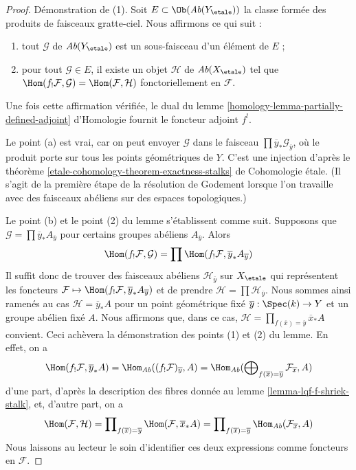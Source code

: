 \begin{proof}
Démonstration de (1). Soit $E \subset \Ob(\textit{Ab}(Y_\etale))$ la classe
formée des produits de faisceaux gratte-ciel. Nous affirmons ce qui suit :
\begin{enumerate}
\item[(a)] tout $\mathcal{G}$ de $\textit{Ab}(Y_\etale)$ est un sous-faisceau
d'un élément de $E$ ;
\item[(b)] pour tout $\mathcal{G} \in E$, il existe un objet
$\mathcal{H}$ de $\textit{Ab}(X_\etale)$ tel que
$\Hom(f_!\mathcal{F}, \mathcal{G}) = \Hom(\mathcal{F}, \mathcal{H})$
fonctoriellement en $\mathcal{F}$.
\end{enumerate}
Une fois cette affirmation vérifiée, le dual du
lemme \ref{homology-lemma-partially-defined-adjoint} d'Homologie
fournit le foncteur adjoint $f^!$.

\medskip\noindent
Le point (a) est vrai, car on peut envoyer $\mathcal{G}$ dans le faisceau
$\prod \overline{y}_*\mathcal{G}_{\overline{y}}$, où le
produit porte sur tous les points géométriques de $Y$. C'est une injection d'après le
théorème \ref{etale-cohomology-theorem-exactness-stalks} de Cohomologie étale.
(Il s'agit de la première étape de la résolution de Godement lorsque
l'on travaille avec des faisceaux abéliens sur des espaces topologiques.)

\medskip\noindent
Le point (b) et le point (2) du lemme s'établissent comme suit.
Supposons que $\mathcal{G} = \prod \overline{y}_*A_{\overline{y}}$
pour certains groupes abéliens $A_{\overline{y}}$. Alors
$$
\Hom(f_!\mathcal{F}, \mathcal{G}) =
\prod \Hom(f_!\mathcal{F}, \overline{y}_*A_{\overline{y}})
$$
Il suffit donc de trouver des faisceaux abéliens $\mathcal{H}_{\overline{y}}$
sur $X_\etale$ qui représentent les foncteurs
$\mathcal{F} \mapsto \Hom(f_!\mathcal{F}, \overline{y}_*A_{\overline{y}})$
et de prendre $\mathcal{H} = \prod \mathcal{H}_{\overline{y}}$.
Nous sommes ainsi ramenés au cas $\mathcal{H} = \overline{y}_*A$
pour un point géométrique fixé $\overline{y} : \Spec(k) \to Y$
et un groupe abélien fixé $A$. Nous affirmons que, dans ce cas,
$\mathcal{H} = \prod_{f(\overline{x}) = \overline{y}} \overline{x}_*A$ convient.
Ceci achèvera la démonstration des points (1) et (2) du lemme.
En effet, on a
$$
\Hom(f_!\mathcal{F}, \overline{y}_*A) =
\Hom_{\textit{Ab}}((f_!\mathcal{F})_{\overline{y}}, A) =
\Hom_{\textit{Ab}}(\bigoplus\nolimits_{f(\overline{x}) = \overline{y}}
\mathcal{F}_{\overline{x}}, A)
$$
d'une part, d'après la description des fibres donnée au
lemme \ref{lemma-lqf-f-shriek-stalk},
et, d'autre part, on a
$$
\Hom(\mathcal{F}, \mathcal{H}) =
\prod\nolimits_{f(\overline{x}) = \overline{y}}
\Hom(\mathcal{F}, \overline{x}_*A) =
\prod\nolimits_{f(\overline{x}) = \overline{y}}
\Hom_{\textit{Ab}}(\mathcal{F}_{\overline{x}}, A)
$$
Nous laissons au lecteur le soin d'identifier ces deux expressions comme foncteurs en $\mathcal{F}$.


\end{proof}
